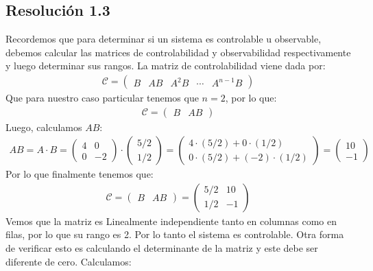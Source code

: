 \documentclass[
  11pt,
  letterpaper,
   addpoints,
  answers
  ]{exam}
\begin{document}
\begin{questions}
\begin{solution}
  \subsection*{Resolución 1.3}
Recordemos que para determinar si un sistema es controlable u observable, debemos calcular las matrices de controlabilidad y observabilidad respectivamente y luego determinar sus rangos. La matriz de controlabilidad viene dada por:
\begin{align}
  \mathcal C = \begin{pmatrix} B & AB & A^2B & \cdots & A^{n-1}B \end{pmatrix}
\end{align}
Que para nuestro caso particular tenemos que $n=2$, por lo que:
\begin{align}
  \mathcal C = \begin{pmatrix} B & AB \end{pmatrix}
\end{align}
Luego, calculamos $AB$:
\begin{align}
  AB = A \cdot B = \begin{pmatrix} 4 & 0 \\ 0 & -2 \end{pmatrix} \cdot \begin{pmatrix} 5/2 \\ 1/2 \end{pmatrix} = \begin{pmatrix} 4 \cdot (5/2) + 0 \cdot (1/2) \\ 0 \cdot (5/2) + (-2) \cdot (1/2) \end{pmatrix} = \begin{pmatrix} 10 \\ -1 \end{pmatrix}
\end{align}
Por lo que finalmente tenemos que:
\begin{align}
  \mathcal C = \begin{pmatrix} B & AB \end{pmatrix} = \begin{pmatrix} 5/2 & 10 \\ 1/2 & -1 \end{pmatrix}
\end{align}
Vemos que la matriz es Linealmente independiente tanto en columnas como en filas, por lo que su rango es 2. Por lo tanto el sistema es controlable. Otra forma de verificar esto es calculando el determinante de la matriz y este debe ser diferente de cero. Calculamos:
\begin{align}

\end{align}
\end{solution}
\end{questions}
\end{document}
